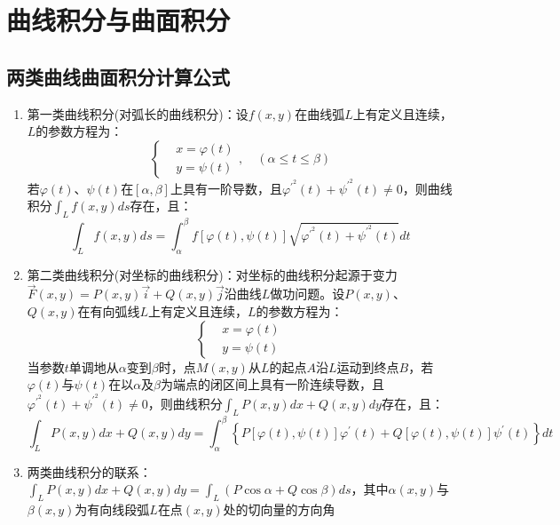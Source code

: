 \documentclass[12pt,a4paper,UTF8]{book}
\begin{document}
\section{曲线积分与曲面积分}
\subsection{两类曲线曲面积分计算公式}
\begin{enumerate}
\item 第一类曲线积分(对弧长的曲线积分)：设$f\left(x,y\right)$在曲线弧$L$上有定义且连续，$L$的参数方程为：
\[\left\{\begin{aligned}
&x=\varphi\left(t\right)\\
&y=\psi\left(t\right)
\end{aligned}\right.,\quad\left(\alpha\leq t\leq\beta\right)\]
若$\varphi\left(t\right)$、$\psi\left(t\right)$在$\left[\alpha,\beta\right]$上具有一阶导数，且$\varphi^{\prime^2}\left(t\right)+\psi^{\prime^2}\left(t\right)\ne0$，则曲线积分$\int_{L}f\left(x,y\right)ds$存在，且：
\[\int_{L}f\left(x,y\right)ds=\int_{\alpha}^{\beta}f\left[\varphi\left(t\right),\psi\left(t\right)\right]\sqrt{\varphi^{\prime^2}\left(t\right)+\psi^{\prime^2}\left(t\right)}dt\]
\item 第二类曲线积分(对坐标的曲线积分)：对坐标的曲线积分起源于变力$\vec{F}\left(x,y\right)=P\left(x,y\right)\vec{i}+Q\left(x,y\right)\vec{j}$沿曲线$L$做功问题。设$P\left(x,y\right)$、$Q\left(x,y\right)$在有向弧线$L$上有定义且连续，$L$的参数方程为：
\[\left\{\begin{aligned}
&x=\varphi\left(t\right)\\
&y=\psi\left(t\right)
\end{aligned}\right.\]
当参数$t$单调地从$\alpha$变到$\beta$时，点$M\left(x,y\right)$从$L$的起点$A$沿$L$运动到终点$B$，若$\varphi\left(t\right)$与$\psi\left(t\right)$在以$\alpha$及$\beta$为端点的闭区间上具有一阶连续导数，且$\varphi^{\prime^2}\left(t\right)+\psi^{\prime^2}\left(t\right)\ne0$，则曲线积分$\int_{L}P\left(x,y\right)dx+Q\left(x,y\right)dy$存在，且：
\[\int_{L}P\left(x,y\right)dx+Q\left(x,y\right)dy=\int_{\alpha}^{\beta}\left\{P\left[\varphi\left(t\right),\psi\left(t\right)\right]\varphi^{\prime}\left(t\right)+Q\left[\varphi\left(t\right),\psi\left(t\right)\right]\psi^{\prime}\left(t\right)\right\}dt\]
\item 两类曲线积分的联系：$\int_{L}P\left(x,y\right)dx+Q\left(x,y\right)dy=\int_{L}\left(P\cos\alpha+Q\cos\beta\right)ds$，其中$\alpha\left(x,y\right)$与$\beta\left(x,y\right)$为有向线段弧$L$在点$\left(x,y\right)$处的切向量的方向角

\end{enumerate}
\end{document}
